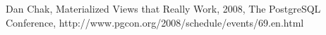 \documentclass[a4paper,12pt]{report}
\begin{document}
\begin{thebibliography}{99}





Dan Chak, Materialized Views that Really Work,
2008, The PostgreSQL Conference, http://www.pgcon.org/2008/schedule/events/69.en.html

\end{thebibliography}

\listoffigures


\end{document}
